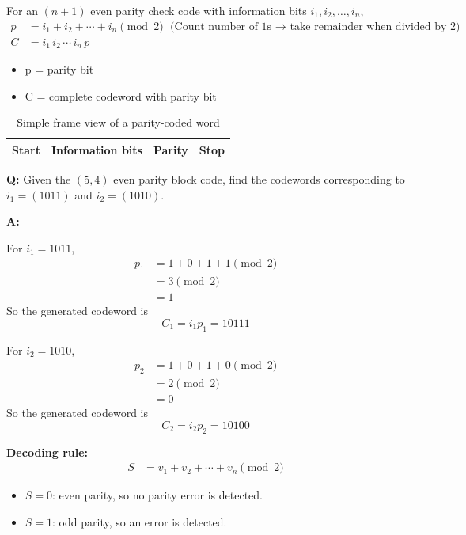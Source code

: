 \documentclass[11pt,a4paper]{book}
\newenvironment{formulabox}[1][Formula]{%
    \begin{tcolorbox}[
        enhanced,
        breakable,
        colback=softcoral!10,
        colframe=softcoral!200,
        title=#1,
        fonttitle=\bfseries,
        coltitle=white,
        sharp corners,
        boxrule=1pt,
        left=8pt,
        right=8pt,
        top=6pt,
        bottom=6pt
    ]
}{\end{tcolorbox}}
\newcounter{qna}[chapter]
\renewcommand{\theqna}{\thechapter.\arabic{qna}}
\newenvironment{questionanswerbox}[1][Example]{%
    \refstepcounter{qna}
    \begin{tcolorbox}[
        enhanced,
        breakable,
        colback=softlavender!10,
        colframe=softlavender!200,
        title={#1~\theqna},
        fonttitle=\bfseries,
        coltitle=white,
        colbacktitle=softlavender!200,
        sharp corners,
        boxrule=1pt,
        left=8pt,
        right=8pt,
        top=6pt,
        bottom=6pt
    ]
}{\end{tcolorbox}}
\begin{document}
\begin{formulabox}[Parity Bit Calculation]

For an \((n+1)\) even parity check code with information bits \(i_1,i_2,\ldots,i_n\),
\begin{align*}
p &= i_1+i_2+\cdots+i_n \pmod 2 \text{ (Count number of 1s $\rightarrow$ take remainder when divided by 2)}\\
C &= i_1\,i_2\,\cdots\,i_n\,p
\end{align*}
\begin{itemize}
    \item p = parity bit
    \item C = complete codeword with parity bit
\end{itemize}
\end{formulabox}

\begin{table}[H]
\centering
\begin{tabular}{|p{1.5cm}|p{4cm}|p{2cm}|p{1.5cm}|}
\hline
\centering Start &
\centering Information bits &
\centering Parity &
\centering Stop \tabularnewline
\hline
\end{tabular}
\caption{Simple frame view of a parity-coded word}
\end{table}

\begin{questionanswerbox}[(5,4) Even Parity Block Code Example]
\textbf{Q:} Given the \((5,4)\) even parity block code, find the codewords corresponding to \(i_1=(1011)\) and \(i_2=(1010)\).

\textbf{A:}

For \(i_1=1011\),
\begin{align*}
p_1 &= 1+0+1+1 \pmod 2\\
    &= 3 \pmod 2\\
    &= 1
\end{align*}
So the generated codeword is
\[
C_1 = i_1p_1 = 10111
\]

For \(i_2=1010\),
\begin{align*}
p_2 &= 1+0+1+0 \pmod 2\\
    &= 2 \pmod 2\\
    &= 0
\end{align*}
So the generated codeword is
\[
C_2 = i_2p_2 = 10100
\]

\textbf{Decoding rule:}
\begin{align*}
S &= v_1+v_2+\cdots+v_n \pmod 2
\end{align*}
\begin{itemize}
    \item \(S=0\): even parity, so no parity error is detected.
    \item \(S=1\): odd parity, so an error is detected.
\end{itemize}
\end{questionanswerbox}
\end{document}
